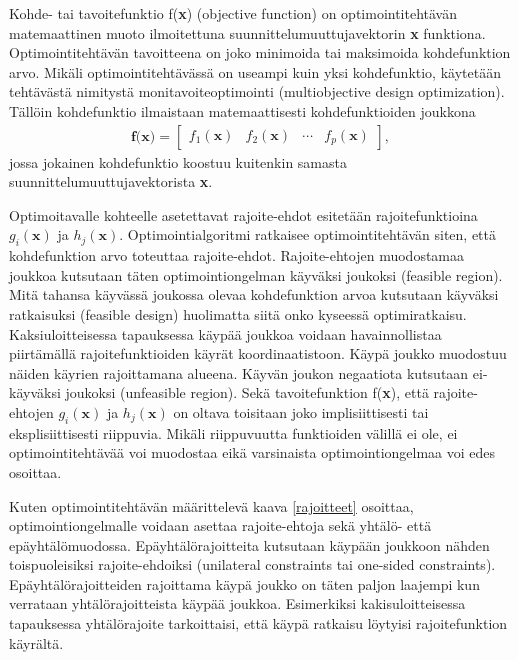 \documentclass[12pt]{article}
\newenvironment{content}{\pagenumbering{arabic}}{}
\begin{document}
\begin{content}
Kohde- tai tavoitefunktio f(\textbf{x}) (objective function) on optimointitehtävän matemaattinen muoto ilmoitettuna suunnittelumuuttujavektorin \textbf{x} funktiona. Optimointitehtävän tavoitteena on joko minimoida tai maksimoida kohdefunktion arvo. Mikäli optimointitehtävässä on useampi kuin yksi kohdefunktio, käytetään tehtävästä nimitystä monitavoiteoptimointi (multiobjective design optimization). Tällöin kohdefunktio ilmaistaan matemaattisesti kohdefunktioiden joukkona 
\begin{align}
\textbf{f(x)} = \begin{bmatrix}
f_1(\textbf{x}) &  f_2(\textbf{x}) & \cdots & f_p(\textbf{x})
\end{bmatrix},
\end{align}
jossa jokainen kohdefunktio koostuu kuitenkin samasta suunnittelumuuttujavektorista \textbf{x}.

Optimoitavalle kohteelle asetettavat rajoite-ehdot esitetään rajoitefunktioina $g_i(\textbf{x})$ ja $h_j(\textbf{x})$. Optimointialgoritmi ratkaisee optimointitehtävän siten, että kohdefunktion arvo toteuttaa rajoite-ehdot. Rajoite-ehtojen muodostamaa joukkoa kutsutaan täten optimointiongelman käyväksi joukoksi (feasible region). Mitä tahansa käyvässä joukossa olevaa kohdefunktion arvoa kutsutaan käyväksi ratkaisuksi (feasible design) huolimatta siitä onko kyseessä optimiratkaisu. Kaksiuloitteisessa tapauksessa käypää joukkoa voidaan havainnollistaa piirtämällä rajoitefunktioiden käyrät koordinaatistoon. Käypä joukko muodostuu näiden käyrien rajoittamana alueena. Käyvän joukon negaatiota kutsutaan ei-käyväksi joukoksi (unfeasible region). Sekä tavoitefunktion f(\textbf{x}), että rajoite-ehtojen $g_i(\textbf{x})$ ja $h_j(\textbf{x})$ on oltava toisitaan joko implisiittisesti tai eksplisiittisesti riippuvia. Mikäli riippuvuutta funktioiden välillä ei ole, ei optimointitehtävää voi muodostaa eikä varsinaista optimointiongelmaa voi edes osoittaa. \parencite[43]{intro} 

Kuten optimointitehtävän määrittelevä kaava \eqref{rajoitteet} osoittaa, optimointiongelmalle voidaan asettaa rajoite-ehtoja sekä yhtälö- että epäyhtälömuodossa. Epäyhtälörajoitteita kutsutaan käypään joukkoon nähden toispuoleisiksi rajoite-ehdoiksi (unilateral constraints tai one-sided constraints). Epäyhtälörajoitteiden rajoittama käypä joukko on täten paljon laajempi kun verrataan yhtälörajoitteista käypää joukkoa. Esimerkiksi kakisuloitteisessa tapauksessa yhtälörajoite tarkoittaisi, että käypä ratkaisu löytyisi rajoitefunktion käyrältä. \parencite[16-18]{intro} 


\end{content}
\end{document}
